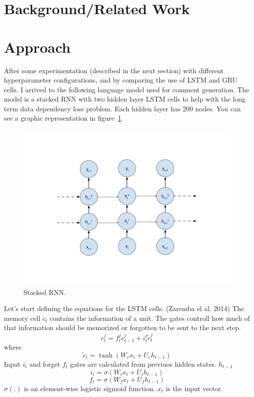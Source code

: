 \documentclass{article} %
\begin{document}
\section{Background/Related Work}


\section{Approach}
After some experimentation (described in the next section) with different
hyperparameter configurations, and by comparing the use of LSTM and GRU cells. I
arrived to the following language model used for comment generation. The model
is a stacked RNN with two hidden layer LSTM cells to help with the long term
data dependency loss problem. Each hidden layer has 200 nodes. You can see a
graphic representation in figure~\ref{fig:rnndiagram}.

\begin{figure}[h]
\centering
\includegraphics[scale=0.4]{rnn_diagram}
\caption{Stacked RNN.}
\label{fig:rnndiagram}
\end{figure}

Let's start defining the equations for the LSTM cells. (Zaremba el al. 2014)
The memory cell $c_t$ contains the information of a unit. The gates controll how
much of that information should be memorized or forgotten to be sent to the next
step.
\begin{equation}
c^j_t = f^j_t c^j_{t-1} + i^j_t \widetilde{c}^j_t
\end{equation}
where
\begin{equation}
\widetilde{c}_t = \tanh{(W_c x_t + U_c h_{t-1})}
\end{equation}
Input $i_t$ and forget $f_t$ gates are calculated from previuos hidden states.
$h_{t-1}$
\begin{equation}
i_t = \sigma{(W_i x_t + U_i h_{t-1})}
\end{equation}
\begin{equation}
f_t = \sigma{(W_f x_t + U_f h_{t-1})}
\end{equation}
$\sigma{(.)}$ is an element-wise logistic sigmoid function. $x_t$ is the input
vector.
\end{document}
